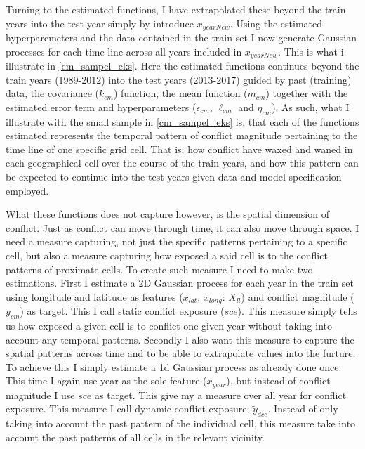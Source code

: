 \documentclass[a4paper]{article}
\begin{document}
Turning to the estimated functions, I have extrapolated these beyond the train years into the test year simply by introduce $x_{yearNew}$. Using the estimated hyperparemeters and the data contained in the train set I now generate Gaussian processes for each time line across all years included in $x_{yearNew}$. This is what i illustrate in \autoref{cm_sampel_eks}. Here the estimated functions continues beyond the train years (1989-2012) into the test years (2013-2017) guided by past (training) data, the covariance ($k_{cm}$) function, the mean function ($m_{cm}$) together with the estimated error term and hyperparameters ($\epsilon_{cm}$, $\ell_{cm}$ and $\eta_{cm}$). As such, what I illustrate with the small sample in \autoref{cm_sampel_eks} is, that each of the functions estimated represents the temporal pattern of conflict magnitude pertaining to the time line of one specific grid cell. That is; how conflict have waxed and waned in each geographical cell over the course of the train years, and how this pattern can be expected to continue into the test years given data and model specification employed.\par

What these functions does not capture however, is the spatial dimension of conflict. Just as conflict can move through time, it can also move through space. I need a measure capturing, not just the specific patterns pertaining to a specific cell, but also a measure capturing how exposed a said cell is to the conflict patterns of proximate cells. To create such measure I need to make two estimations. First I estimate a 2D Gaussian process for each year in the train set using longitude and latitude as features ($x_{lat}$, $x_{long}$: $X_{ll}$) and conflict magnitude  ($y_{cm}$) as target. This I call static conflict exposure ($sce$). This measure simply tells us how exposed a given cell is to conflict one given year without taking into account any temporal patterns. Secondly I also want this measure to capture the spatial patterns across time and to be able to extrapolate values into the furture. To achieve this I simply estimate a 1d Gaussian process as already done once. This time I again use year as the sole feature ($x_{year}$), but instead of conflict magnitude I use $sce$ as target. This give my a measure over all year for conflict exposure. This measure I call dynamic conflict exposure; $\tilde{y}_{dce}$. Instead of only taking into account the past pattern of the individual cell, this measure take into account the past patterns of all cells in the relevant vicinity.\par 
\end{document}
